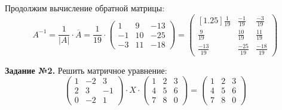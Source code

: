 \documentclass[a4paper, 12pt]{article}
\begin{document}
Продолжим вычисление обратной матрицы:
\[
A^{-1} = \frac{1}{|A|} \cdot \overline{A} = \frac{1}{19} \cdot
\begin{pmatrix}
    1 & 9 & -13  \\
    -1 & 10 & -25 \\ 
    -3 & 11 & -18
\end{pmatrix} = 
\begin{pmatrix}[1.25]
    \frac{1}{19} & \frac{-1}{19} & \frac{-3}{19}  \\ 
    \frac{9}{19} & \frac{10}{19} & \frac{11}{19}  \\
    \frac{-13}{19} & \frac{-25}{19} & \frac{-18}{19}
\end{pmatrix}
\]

\newpage

\textbf{Задание №2.} Решить матричное уравнение:
\[
\begin{pmatrix}
    1 & -2 & 3 \\ 
    2 & 3 & -1 \\ 
    0 & -2 & 1
\end{pmatrix}
\cdot X \cdot 
\begin{pmatrix}
    1 & 2 & 3 \\ 
    4 & 5 & 6 \\ 
    7 & 8 & 0
\end{pmatrix} = 
\begin{pmatrix}
    1 & 2 & 3 \\ 
    4 & 5 & 6 \\ 
    7 & 8 & 0
\end{pmatrix}
\]

\vspace{0.5cm} 
\end{document}
